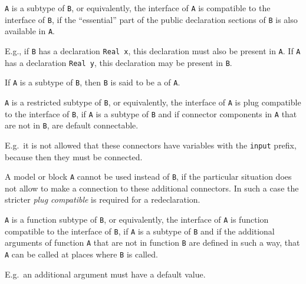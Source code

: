 \begin{definition}
\lstinline!A! is a subtype of \lstinline!B!, or equivalently, the interface of \lstinline!A! is compatible to the interface of \lstinline!B!, if the ``essential'' part of the public declaration
sections of \lstinline!B! is also available in \lstinline!A!.
\par
\begin{nonnormative*}
E.g., if \lstinline!B! has a declaration \lstinline!Real x!, this declaration must also be present in \lstinline!A!.
If \lstinline!A! has a declaration \lstinline!Real y!, this declaration may be present in \lstinline!B!.
\end{nonnormative*}
\end{definition}

If \lstinline!A! is a subtype of \lstinline!B!, then \lstinline!B! is said to be a  of \lstinline!A!.

\begin{definition}
\lstinline!A! is a restricted subtype of \lstinline!B!, or equivalently, the interface of \lstinline!A! is plug compatible to the interface of \lstinline!B!, if \lstinline!A! is a subtype of
\lstinline!B! and if connector components in \lstinline!A! that are not in \lstinline!B!, are default connectable.
\begin{nonnormative}
E.g.\ it is not allowed that these connectors have variables with the \lstinline!input! prefix, because then they must be connected.
\end{nonnormative}
A model or block \lstinline!A! cannot be used instead of \lstinline!B!, if the particular situation does not allow to make a connection to these additional connectors. In such a case the stricter
\emph{plug compatible} is required for a redeclaration.
\end{definition}

\begin{definition}
\lstinline!A! is a function subtype of \lstinline!B!, or equivalently, the interface of \lstinline!A! is function compatible to the interface of \lstinline!B!, if \lstinline!A! is a subtype of
\lstinline!B! and if the additional arguments of function \lstinline!A! that are not in function \lstinline!B! are defined in such a way, that \lstinline!A! can be called at places where
\lstinline!B! is called.
\par
\begin{nonnormative*}
E.g.\ an additional argument must have a default value.
\end{nonnormative*}
\end{definition}

